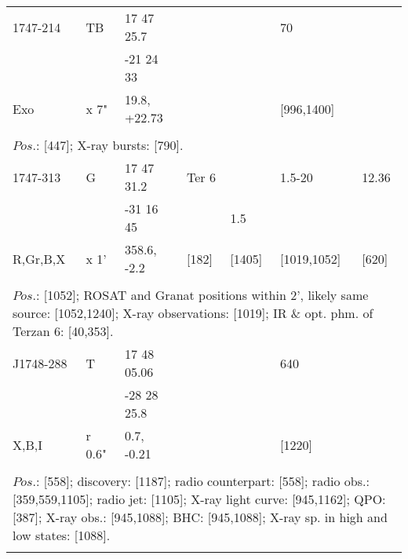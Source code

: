 \documentclass{aa}
\begin{document}
\begin{tabular}{p{2.5cm}p{1cm}p{1.8cm}p{2.3cm}p{3.3cm}p{2.0cm}p{2.2cm}}
\noalign{\smallskip}
1747-214     & TB         & 17 47 25.7         &                    &                           & 70                 &          \\
                      &                & -21 24 33           &                    &                           &                      &         \\
Exo               & x 7"        & 19.8, +22.73     &                    &                           & [996,1400]  &         \\
\\
\multicolumn{7}{p{17.5cm}}{
$Pos$.: [447]; X-ray bursts: [790].}\\
\noalign{\smallskip}
\hline

\noalign{\smallskip}
1747-313      & G            & 17 47 31.2            & Ter 6          &                          & 1.5-20                & 12.36         \\
                       &                & -31 16 45              &                     & 1.5                    &                            &         \\
R,Gr,B,X      & x 1'         & 358.6, -2.2            & [182]           & [1405]              & [1019,1052]      & [620]        \\
\\
\multicolumn{7}{p{17.5cm}}{
$Pos$.: [1052]; ROSAT and Granat positions within 2', likely same source: [1052,1240]; X-ray observations: [1019]; 
IR \& opt. phm. of Terzan 6: [40,353].}\\
\noalign{\smallskip}
\hline

\noalign{\smallskip}
J1748-288   & T            & 17 48 05.06    &                &                          &   640                     &          \\
                      &                & -28 28 25.8     &                &                          &                               &         \\
X,B,I             & r 0.6"      & 0.7, -0.21         &                &                          & [1220]                   &         \\
\\
\multicolumn{7}{p{17.5cm}}{
$Pos$.: [558]; discovery: [1187]; radio counterpart: [558]; radio obs.: [359,559,1105]; radio jet: [1105]; X-ray light 
curve: [945,1162]; QPO: [387]; X-ray obs.: [945,1088]; BHC: [945,1088]; X-ray sp. in high and low states: [1088].}\\
\noalign{\smallskip}
\hline


\end{tabular}
\end{document}
